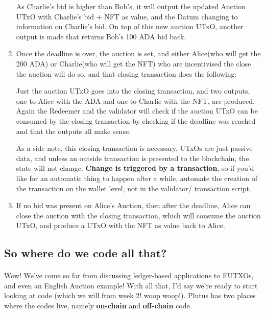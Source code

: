 \documentclass[a4paper, 11pt]{article}
\begin{document}
\begin{enumerate}
        As Charlie's bid is higher than Bob's, it will output the updated Auction UTxO with Charlie's bid + NFT as value, and the Datum changing to information on Charlie's bid. On top of this new auction UTxO, another output is made that returns Bob's 100 ADA bid back.
        
        \item Once the deadline is over, the auction is set, and either Alice(who will get the 200 ADA) or Charlie(who will get the NFT) who are incentivised the close the auction will do so, and that closing transaction does the following:
        
        Just the auction UTxO goes into the closing transaction, and two outputs, one to Alice with the ADA and one to Charlie with the NFT, are produced. Again the Redeemer and the validator will check if the auction UTxO can be consumed by the closing transaction by checking if the deadline was reached and that the outputs all make sense.

        As a side note, this closing transaction is necessary. UTxOs are just passive data, and unless an outside transaction is presented to the blockchain, the state will not change. \textbf{Change is triggered by a transaction}, so if you'd like for an automatic thing to happen after a while, automate the creation of the transaction on the wallet level, not in the validator/ transaction script.

        \item If no bid was present on Alice's Auction, then after the deadline, Alice can close the auction with the closing transaction, which will consume the auction UTxO, and produce a UTxO with the NFT as value back to Alice.
        \end{enumerate}


    \subsection{So where do we code all that?}

    \paragraph{} Wow! We've come so far from discussing ledger-based applications to EUTXOs, and even an English Auction example! With all that, I'd say we're ready to start looking at code (which we will from week 2! woop woop!).  Plutus has two places where the codes live, namely \textbf{on-chain} and \textbf{off-chain} code.
\end{document}
